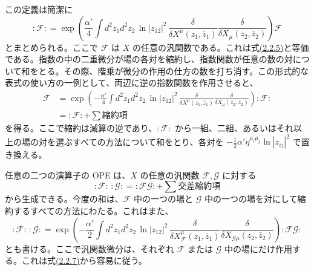 この定義は簡潔に
\begin{equation}
:\mathcal F:
=\exp\left(\frac{\alpha'}4\int d^2z_1d^2z_2\,
\ln|z_{12}|^2\,
\frac{\delta}{\delta X^\mu(z_1,\bar z_1)}
\frac{\delta}{\delta X_\mu(z_2,\bar z_2)}\right)\mathcal F
\tag{2.2.7}\label{eq:2.2.7}
\end{equation}
とまとめられる。ここで $\mathcal F$ は $X$ の任意の汎関数である。これは式\hyperref[eq:2.2.5]{(2.2.5)}と等価である。指数の中の二重微分が場の各対を縮約し、指数関数が任意の数の対について和をとる。その際、階乗が微分の作用の仕方の数を打ち消す。この形式的な表式の使い方の一例として、両辺に逆の指数関数を作用させると、
\begin{equation}
\begin{aligned}
\mathcal F
&=\exp\left(-\frac{\alpha'}4\int d^2z_1d^2z_2\,
\ln|z_{12}|^2\,
\frac{\delta}{\delta X^\mu(z_1,\bar z_1)}
\frac{\delta}{\delta X_\mu(z_2,\bar z_2)}\right):\mathcal F:\\
&=:\mathcal F:+\sum\text{縮約項}
\end{aligned}
\tag{2.2.8}\label{eq:2.2.8}
\end{equation}
を得る。ここで縮約は減算の逆であり、$:\mathcal F:$ から一組、二組、あるいはそれ以上の場の対を選ぶすべての方法について和をとり、各対を $-\tfrac12\alpha'\eta^{\mu_i\mu_j}\ln|z_{ij}|^2$ で置き換える。

任意の二つの演算子の OPE は、$X$ の任意の汎関数 $\mathcal F,\mathcal G$ に対する
\begin{equation}
:\mathcal F:\,:\mathcal G:
=:\mathcal F\mathcal G:+\sum\text{交差縮約項}
\tag{2.2.9}\label{eq:2.2.9}
\end{equation}
から生成できる。今度の和は、$\mathcal F$ 中の一つの場と $\mathcal G$ 中の一つの場を対にして縮約するすべての方法にわたる。これはまた、
\begin{equation}
:\mathcal F:\,:\mathcal G:
=\exp\left(-\frac{\alpha'}2\int d^2z_1d^2z_2\,\ln|z_{12}|^2\,
\frac{\delta}{\delta X_{\mathcal F}^{\mu}(z_1,\bar z_1)}
\frac{\delta}{\delta X_{\mathcal G\mu}(z_2,\bar z_2)}\right)
:\mathcal F\mathcal G:
\tag{2.2.10}\label{eq:2.2.10}
\end{equation}
とも書ける。ここで汎関数微分は、それぞれ $\mathcal F$ または $\mathcal G$ 中の場にだけ作用する。これは式\hyperref[eq:2.2.7]{(2.2.7)}から容易に従う。

